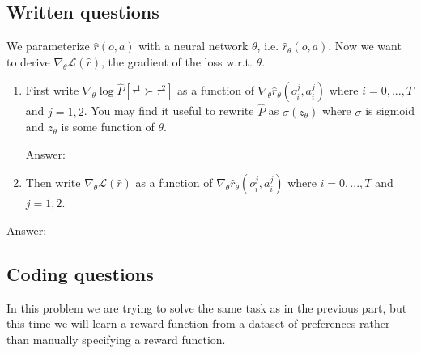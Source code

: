 \documentclass{article}
\newcommand{\answer}[1]{
    \begin{tcolorbox}[breakable]
    Answer: #1
    \end{tcolorbox}
    \clearpage
}
\begin{document}
\subsection{Written questions}

We parameterize $\hat{r}(o, a)$ with a neural network $\theta$, i.e. $\hat{r}_\theta(o, a)$. Now we want to derive $\nabla_\theta \mathcal{L}(\hat{r})$, the gradient of the loss w.r.t. $\theta$.

\begin{enumerate}
\item [(a)] First write $\nabla_\theta \log \hat{P}[\tau^1 \succ \tau^2]$ as a function of $\nabla_\theta \hat{r}_\theta(o^j_i, a^{j}_i)$ where $i = 0, ..., T$ and $j = 1, 2$. You may find it useful to rewrite $\hat{P}$ as $\sigma(z_\theta)$ where $\sigma$ is sigmoid and $z_\theta$ is some function of $\theta$.
\answer{

}

\item [(b)] Then write $\nabla_\theta \mathcal{L}(\hat{r})$ as a function of $\nabla_\theta \hat{r}_\theta(o^j_i, a^{j}_i)$ where $i = 0, ..., T$ and $j = 1, 2$. 
\end{enumerate}
\answer{

}

\subsection{Coding questions}

In this problem we are trying to solve the same task as in the previous part, but this time we will learn a reward function from a dataset of preferences rather than manually specifying a reward function. 
\end{document}
